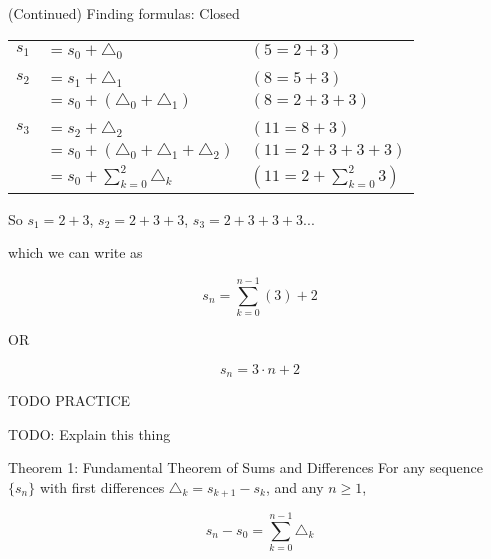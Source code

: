 {\begin{intro}{(Continued) Finding formulas: Closed}
        \begin{center}
            \begin{tabular}{c l | l}
                $s_{1}$ &   $= s_{0} + \triangle_{0}$                       & $(5 = 2 + 3)$
                \\ \\
                $s_{2}$ &   $= s_{1} + \triangle_{1}$                       & $(8 = 5 + 3)$
                \\
                &           $= s_{0} + (\triangle_{0} + \triangle_{1})$     & $(8 = 2 + 3 + 3)$
                \\ \\
                $s_{3}$ &   $= s_{2} + \triangle_{2}$                       & $(11 = 8 + 3)$
                \\
                &           $= s_{0} + (\triangle_{0} + \triangle_{1} + \triangle_{2})$ & $(11 = 2 + 3 + 3 + 3)$
                \\
                &           $= s_{0} + \sum_{k=0}^{2}{ \triangle_{k} }$     & $(11 = 2 + \sum_{k=0}^{2}{3})$
            \end{tabular}
        \end{center}

        So $s_{1} = 2 + 3$, \tab $s_{2} = 2 + 3 + 3$, \tab $s_{3} = 2 + 3 + 3 + 3$...
        
        which we can write as

        $$ s_{n} = \sum_{k=0}^{n-1}{ (3) } + 2$$
        \begin{center}
            OR
        \end{center}
        $$ s_{n} = 3 \cdot n + 2 $$
    \end{intro}

    
    \begin{questionNOGRADE}{\thequestion}
        TODO PRACTICE
    \end{questionNOGRADE}

    \newpage

    TODO: Explain this thing

    \begin{intro}{Theorem 1: Fundamental Theorem of Sums and Differences}
        For any sequence $\{s_{n}\}$ with first differences $\triangle_{k} = s_{k+1} - s_{k}$,
        and any $n \geq 1$,

        $$s_{n} - s_{0} = \sum_{k=0}^{n-1}{ \triangle_{k} } $$
    \end{intro}


}
